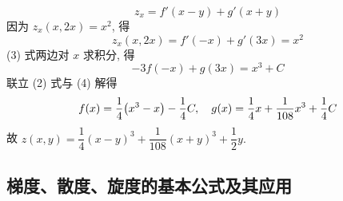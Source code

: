 \begin{solution}
\begin{enumerate}[label=(\arabic{*})]
$$        z_x=f'(x-y)+g'(x+y)
        $$
        因为 $z_x(x,2x)=x^2$, 得 
        \begin{equation*}
            z_x(x,2x)=f'(-x)+g'(3x)=x^2
            \tag{3}
        \end{equation*}
        (3) 式两边对 $x$ 求积分, 得 
        \begin{equation*}
            -3f(-x)+g(3x)=x^3+C 
            \tag{4}
        \end{equation*}
        联立 (2) 式与 (4) 解得 
        $$
        f(x)=\dfrac{1}{4}\qty(x^3-x)-\dfrac{1}{4}C, \quad g(x)=\dfrac{1}{4}x+\dfrac{1}{108}x^3+\dfrac{1}{4}C
        $$
        故 $z(x,y)=\dfrac{1}{4}(x-y)^3+\dfrac{1}{108}(x+y)^3+\dfrac{1}{2}y.$
    \end{enumerate}
\end{solution}

\subsection{梯度、散度、旋度的基本公式及其应用}

